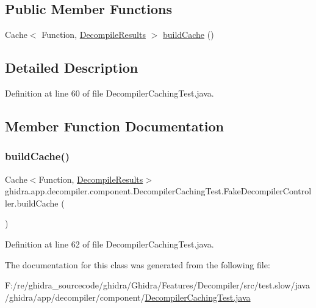 \subsection*{Public Member Functions}
\begin{DoxyCompactItemize}
\item 
Cache$<$ Function, \mbox{\hyperlink{classghidra_1_1app_1_1decompiler_1_1_decompile_results}{Decompile\+Results}} $>$ \mbox{\hyperlink{classghidra_1_1app_1_1decompiler_1_1component_1_1_decompiler_caching_test_1_1_fake_decompiler_controller_af76bfb66f9c63af840fdc3096fd26bb9}{build\+Cache}} ()
\end{DoxyCompactItemize}


\subsection{Detailed Description}


Definition at line 60 of file Decompiler\+Caching\+Test.\+java.



\subsection{Member Function Documentation}
\mbox{\label{classghidra_1_1app_1_1decompiler_1_1component_1_1_decompiler_caching_test_1_1_fake_decompiler_controller_af76bfb66f9c63af840fdc3096fd26bb9}} 
\subsubsection{\texorpdfstring{buildCache()}{buildCache()}}
{\footnotesize\ttfamily Cache$<$Function, \mbox{\hyperlink{classghidra_1_1app_1_1decompiler_1_1_decompile_results}{Decompile\+Results}}$>$ ghidra.\+app.\+decompiler.\+component.\+Decompiler\+Caching\+Test.\+Fake\+Decompiler\+Controller.\+build\+Cache (\begin{DoxyParamCaption}{ }\end{DoxyParamCaption})\hspace{0.3cm}{\ttfamily [inline]}}



Definition at line 62 of file Decompiler\+Caching\+Test.\+java.



The documentation for this class was generated from the following file\+:\begin{DoxyCompactItemize}
\item 
F\+:/re/ghidra\+\_\+sourcecode/ghidra/\+Ghidra/\+Features/\+Decompiler/src/test.\+slow/java/ghidra/app/decompiler/component/\mbox{\hyperlink{_decompiler_caching_test_8java}{Decompiler\+Caching\+Test.\+java}}\end{DoxyCompactItemize}

